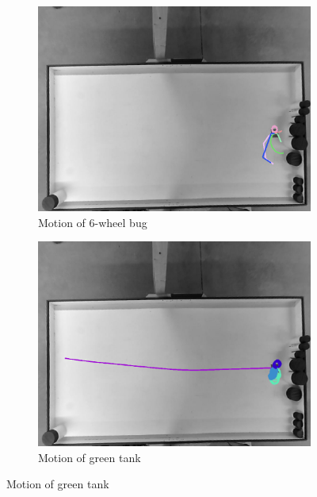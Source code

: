 \begin{figure}
	\begin{subfigure}[t]{0.47\textwidth}
		\includegraphics[width=\textwidth]{../hardwareX_paper/robot_6.png}
		\caption{Motion of 6-wheel bug}
	\end{subfigure}
	\begin{subfigure}[t]{0.47\textwidth}
		\includegraphics[width=\textwidth]{../hardwareX_paper/robot_0.png}
		\caption{Motion of green tank}
	\end{subfigure}
	

\end{figure}

